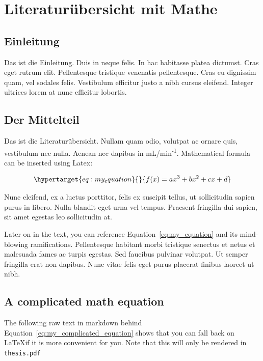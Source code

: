 \documentclass[listof=totoc,index=totoc,bibliography=totoc,12pt,ngerman,a4paper,]{report}
\begin{document}
\chapter{Literaturübersicht mit Mathe}\label{sec:lit-review}

\section{Einleitung}\label{einleitung}

Das ist die Einleitung. Duis in neque felis. In hac habitasse platea
dictumst. Cras eget rutrum elit. Pellentesque tristique venenatis
pellentesque. Cras eu dignissim quam, vel sodales felis. Vestibulum
efficitur justo a nibh cursus eleifend. Integer ultrices lorem at nunc
efficitur lobortis.

\section{Der Mittelteil}\label{der-mittelteil-1}

Das ist die Literaturübersicht. Nullam quam odio, volutpat ac ornare
quis, vestibulum nec nulla. Aenean nec dapibus in
mL/min\textsuperscript{-1}. Mathematical formula can be inserted using
Latex:

\begin{equation}\protect\hypertarget{eq:my_equation}{}{f(x) = ax^3 + bx^2 + cx + d}\label{eq:my_equation}\end{equation}

Nunc eleifend, ex a luctus porttitor, felis ex suscipit tellus, ut
sollicitudin sapien purus in libero. Nulla blandit eget urna vel tempus.
Praesent fringilla dui sapien, sit amet egestas leo sollicitudin at.

Later on in the text, you can reference Equation~\ref{eq:my_equation}
and its mind-blowing ramifications. Pellentesque habitant morbi
tristique senectus et netus et malesuada fames ac turpis egestas. Sed
faucibus pulvinar volutpat. Ut semper fringilla erat non dapibus. Nunc
vitae felis eget purus placerat finibus laoreet ut nibh.

\section{A complicated math equation}\label{a-complicated-math-equation}

The following raw text in markdown behind
Equation~\ref{eq:my_complicated_equation} shows that you can fall back
on \LaTeX if it is more convenient for you. Note that this will only be
rendered in \texttt{thesis.pdf}
\end{document}
